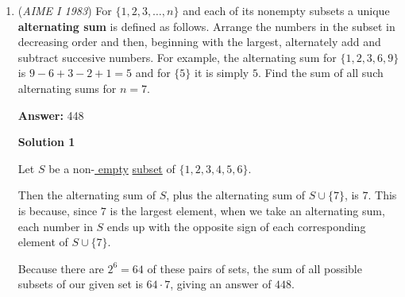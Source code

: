\begin{enumerate}
 Because $OH$ is a positive rational number and $x$ and $y$ are integral, the quantity $99(x+y)(x-y)$ must be a perfect square. Hence either $x-y$ or $x+y$ must be a multiple of $11$, but as $x$ and $y$ are different digits, $1+0=1 \leq x+y \leq 9+9=18$, so the only possible multiple of $11$ is $11$ itself. However, $x-y$ cannot be 11, because both must be digits. Therefore, $x+y$ must equal $11$ and $x-y$ must be a perfect square. The only pair $(x,y)$ that satisfies this condition is $(6,5)$, so our answer is $\boxed{065}$. (Therefore $CD = 56$ and $OH = \frac{33}{2}$.)

 \textbf{Alternate start to solution 1} Since H is the midpoint of $CD$, by \href{https://artofproblemsolving.com/wiki/index.php?title=Power\_of\_a\_Point}{Power of a Point}, $CH^2=(AH)(BH)$. Because $AH=r-OH$ and $BH=r+OH$, where $r$ is the radius of the circle, we deduce the relation $CH^2=r^2-OH^2$. Thus $OH^2=\left(\frac{10x+y}{2}\right)^2-\left(\frac{10y+x}{2}\right)^2$. Continue as above.

 


	\item (\textit{AIME I 1983}) For $\{1, 2, 3, \ldots, n\}$ and each of its nonempty subsets a unique \textbf{alternating sum} is defined as follows. Arrange the numbers in the subset in decreasing order and then, beginning with the largest, alternately add and subtract succesive numbers. For example, the alternating sum for $\{1, 2, 3, 6,9\}$ is $9-6+3-2+1=5$ and for $\{5\}$ it is simply $5$. Find the sum of all such alternating sums for $n=7$.


 
 \textbf{Answer: }448



\textbf{Solution 1}

Let $S$ be a non-\href{https://artofproblemsolving.com/wiki/index.php?title=Empty\_set}{ empty} \href{https://artofproblemsolving.com/wiki/index.php?title=Subset}{subset} of $\{1,2,3,4,5,6\}$. 

 Then the alternating sum of $S$, plus the alternating sum of $S \cup \{7\}$, is $7$. This is because, since $7$ is the largest element, when we take an alternating sum, each number in $S$ ends up with the opposite sign of each corresponding element of $S\cup \{7\}$.

 Because there are $2^{6}=64$ of these pairs of sets, the sum of all possible subsets of our given set is $64 \cdot 7$, giving an answer of $\boxed{448}$.

 




\end{enumerate}
